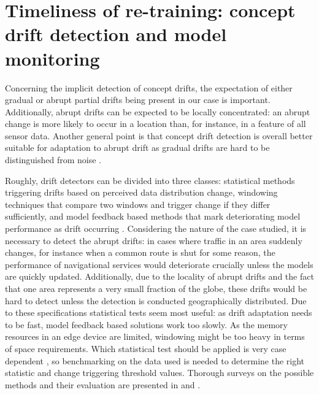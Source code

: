 \section{Timeliness of re-training: concept drift detection and model monitoring}



Concerning the implicit detection of concept drifts, the expectation of either gradual or abrupt partial drifts being present in our case is important. Additionally, abrupt drifts can be expected to be locally concentrated: an abrupt change is more likely to occur in a location than, for instance, in a feature of all sensor data. Another general point is that concept drift detection is overall better suitable for adaptation to abrupt drift as gradual drifts are hard to be distinguished from noise \cite{zliobaiteLearningConceptDrift2010}. 

Roughly, drift detectors can be divided into three classes: statistical methods triggering drifts based on perceived data distribution change, windowing techniques that compare two windows and trigger change if they differ sufficiently, and model feedback based methods that mark deteriorating model performance as drift occurring \cite{faithfullUnsupervisedChangeDetection2018}. Considering the nature of the case studied, it is necessary to detect the abrupt drifts: in cases where traffic in an area suddenly changes, for instance when a common route is shut for some reason, the performance of navigational services would deteriorate crucially unless the models are quickly updated. Additionally, due to the locality of abrupt drifts and the fact that one area represents a very small fraction of the globe, these drifts would be hard to detect unless the detection is conducted geographically distributed. Due to these specifications statistical tests seem most useful: as drift adaptation needs to be fast, model feedback based solutions work too slowly. As the memory resources in an edge device are limited, windowing might be too heavy in terms of space requirements. Which statistical test should be applied is very case dependent \cite{faithfullUnsupervisedChangeDetection2018}, so benchmarking on the data used is needed to determine the right statistic and change triggering threshold values. Thorough surveys on the possible methods and their evaluation are presented in \cite{conceptdriftsurvey} and \cite{faithfullUnsupervisedChangeDetection2018}.

